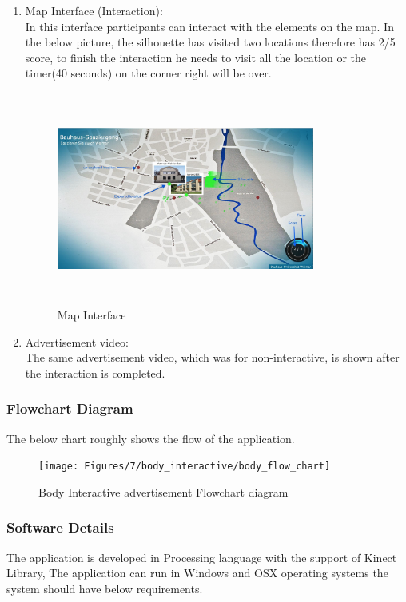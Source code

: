 \begin{enumerate}
\item Map Interface (Interaction): \\
In this interface participants can interact with the elements on the map. In the below picture, the silhouette has visited two locations therefore has 2/5 score, to finish the interaction he needs to visit all the location or the timer(40 seconds) on the corner right will be over.\begin{figure}[H]
    \centering
    \includegraphics[width=0.8\textwidth,height=70mm]{Figures/7/body_interactive/second_interface}
    \caption{Map Interface}%
    \label{fig:body_secondinterface}%
\end{figure}

\item Advertisement video:\\
The same advertisement video, which was for non-interactive, is shown after the interaction is completed.

\end{enumerate}

\iffalse
\subsubsection{Flowchart Diagram}
The below chart roughly shows the flow of the application.
\begin{figure}[H]
    \centering
    \texttt{[image: Figures/7/body\_interactive/body\_flow\_chart]}
    \caption{Body Interactive advertisement Flowchart diagram}%
    \label{fig:Body_flowchat}%
\end{figure}


\subsubsection{Software Details}
The application is developed in Processing language with the support of Kinect Library, The application can run in Windows and OSX operating systems the system should have below requirements.

